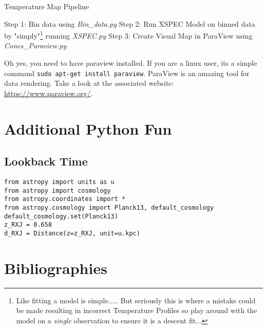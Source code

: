 \documentclass[11pt,letterpaper]{article}
\begin{document}
\begin{algorithm}[H]\label{algo:BA}
	\caption{Temperature Map Pipeline}
	Step 1: Bin data using \textit{Bin\_data.py} \;
	Step 2: Run XSPEC Model on binned data by "simply"\footnote{Like fitting a model is simple..... But seriously this is where a mistake could be made resulting in incorrect Temperature Profiles so play around with the model on a \textit{single} observation to ensure it is a descent fit...} running \textit{XSPEC.py} \;
	Step 3: Create Visual Map in ParaView using \textit{Cones\_Paraview.py} \;
\end{algorithm}

Oh yes, you need to have paraview installed. If you are a linux user, its a simple command \texttt{sudo apt-get install paraview}. ParaView is an amazing tool for data rendering. Take a look at the associated website: \href{https://www.paraview.org/}{https://www.paraview.org/}.


\newpage
\section{Additional Python Fun}
\subsection{Lookback Time}
\begin{lstlisting}
from astropy import units as u
from astropy import cosmology
from astropy.coordinates import *
from astropy.cosmology import Planck13, default_cosmology
default_cosmology.set(Planck13)
z_RXJ = 0.658
d_RXJ = Distance(z=z_RXJ, unit=u.kpc)
\end{lstlisting}


\newpage

\section*{Bibliographies}


\end{document}
